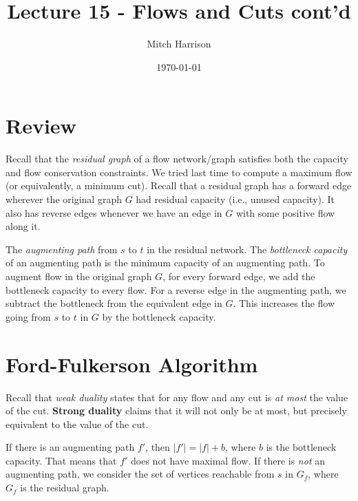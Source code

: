 \documentclass[titlepage, 12pt, leqno]{article}
\title{\Huge{Lecture 15 - Flows and Cuts cont'd}}
\author{\large{Mitch Harrison}}
\date{\today}
\begin{document}
\setlength{\parskip}{1\baselineskip}
\setlength{\parindent}{15pt}
\maketitle
\tableofcontents
\newpage


\section{Review}

Recall that the \textit{residual graph} of a flow network/graph satisfies both
the capacity and flow conservation constraints. We tried last time to compute a
maximum flow (or equivalently, a minimum cut). Recall that a residual graph has
a forward edge wherever the original graph $G$ had residual capacity (i.e.,
unused capacity). It also has reverse edges whenever we have an edge in $G$ with
some positive flow along it.

The \textit{augmenting path} from $s$ to $t$ in the residual network. The
\textit{bottleneck capacity} of an augmenting path is the minimum capacity of an
augmenting path. To augment flow in the original graph $G$, for every forward
edge, we add the bottleneck capacity to every flow. For a reverse edge in the
augmenting path, we subtract the bottleneck from the equivalent edge in $G$. 
This increases the flow going from $s$ to $t$ in $G$ by the bottleneck capacity.

\pagebreak
\section{Ford-Fulkerson Algorithm}
Recall that \textit{weak duality} states that for any flow and any cut is
\textit{at most} the value of the cut. \textbf{Strong duality} claims that it 
will not only be at most, but precisely equivalent to the value of the cut.

If there is an augmenting path $f'$, then $|f'| = |f| + b$, where $b$ is the
bottleneck capacity. That means that $f'$ does not have maximal flow. If there
is \textit{not} an augmenting path, we consider the set of vertices reachable
from $s$ in $G_{f}$, where $G_{f}$ is the residual graph.
\end{document}

